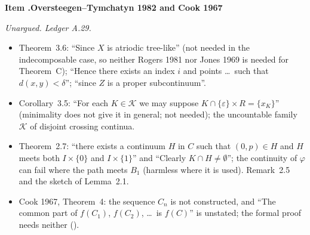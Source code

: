 \documentclass[11pt]{article}
\newcounter{defect}
\newenvironment{defect}[4]{%
  \par\addvspace{10pt}\refstepcounter{defect}%
  \noindent\textbf{Item \thedefect.\enspace #1}\par\nopagebreak
  \noindent\textit{#2}\par\nopagebreak\smallskip}{\par\addvspace{6pt}}
\begin{document}
\begin{defect}{Oversteegen--Tymchatyn 1982 and Cook 1967}{Unargued. Ledger A.29.}{0}{0}\label{it:un-ot}
\begin{itemize}
\item Theorem~3.6: ``Since $X$ is atriodic tree-like'' (not needed in the indecomposable case, so
  neither Rogers 1981 nor Jones 1969 is needed for Theorem~C); ``Hence there exists an index $i$
  and points \ldots\ such that $d(x,y)<\delta$''; ``since $Z$ is a proper subcontinuum''.
\item Corollary~3.5: ``For each $K\in\mathcal K$ we may suppose $K\cap\{\varepsilon\}\times
  R=\{x_K\}$'' (minimality does not give it in general; not needed); the uncountable family
  $\mathcal K$ of disjoint crossing continua.
\item Theorem~2.7: ``there exists a continuum $H$ in $C$ such that $(0,p)\in H$ and $H$ meets both
  $I\times\{0\}$ and $I\times\{1\}$'' and ``Clearly $K\cap H\ne\emptyset$''; the continuity of
  $\varphi$ can fail where the path meets $B_1$ (harmless where it is used). Remark~2.5 and the
  sketch of Lemma~2.1.
\item Cook 1967, Theorem~4: the sequence $C_n$ is not constructed, and ``The common part of
  $f(C_1)$, $f(C_2)$, \ldots\ is $f(C)$'' is unstated; the formal proof needs neither
  ().
\end{itemize}
\end{defect}
\end{document}
